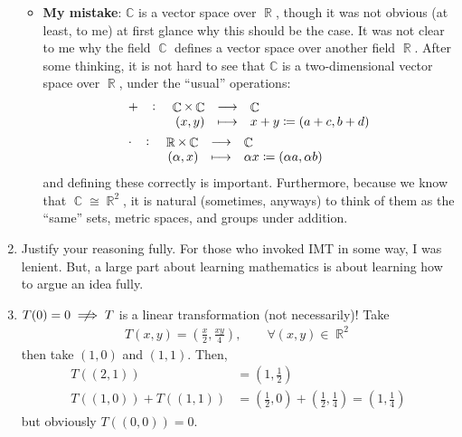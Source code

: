 \documentclass[answers,11pt]{exam}
\theoremstyle{definition}
\DeclareMathOperator{\R}{\mathbb{R}}
\DeclareMathOperator{\Com}{\mathbb{C}}
\DeclareMathOperator{\1}{\mathbbm{1}}
\begin{document}
\begin{enumerate}
\begin{itemize}
		\item \textbf{My mistake}: $\mathbb{C}$ is a vector space over $\R$, though it was not obvious (at least, to me) at first glance why this should be the case. It was not clear to me why the field $\Com$ defines a vector space over another field $\R$. After some thinking, it is not hard to see that $\mathbb{C}$ is a two-dimensional vector space over $\R$, under the ``usual'' operations:
		\begin{align*}
		&\fullfunction{+}{\Com \times \Com}{\Com}{(x,y)}{x+y \coloneqq (a+c,b+d)} \\
		&\fullfunction{\cdot}{\R \times \Com}{\Com}{(\alpha,x)}{\alpha x \coloneqq (\alpha a, \alpha b)}
		\end{align*} 
		and defining these correctly is important. Furthermore, because we know that $\Com \cong \R^2$, it is natural (sometimes, anyways) to think of them as the ``same'' sets, metric spaces, and groups under addition.
		
		
	\end{itemize}
	
	
	\item Justify your reasoning fully. For those who invoked IMT in some way, I was lenient. But, a large part about learning mathematics is about learning how to argue an idea fully.
	
	
	
	\item $T(0) = 0 \centernot\implies T$ is a linear transformation (not necessarily)! Take
	\begin{align*}
	T(x,y) = \left( \frac{x}{2}, \frac{xy}{4} \right), \qquad \forall (x,y) \in \R^2
	\end{align*}
	then take $(1,0)$ and $(1,1)$. Then,
	\begin{align*}
	T((2,1)) &= \left( 1, \frac{1}{2} \right) \\
	T((1,0)) + T((1,1)) &= \left( \frac{1}{2}, 0 \right) + \left( \frac{1}{2}, \frac{1}{4} \right) = \left( 1, \frac{1}{4} \right)
	\end{align*}
	but obviously $T((0,0)) = 0$.
\end{enumerate}
\end{document}
